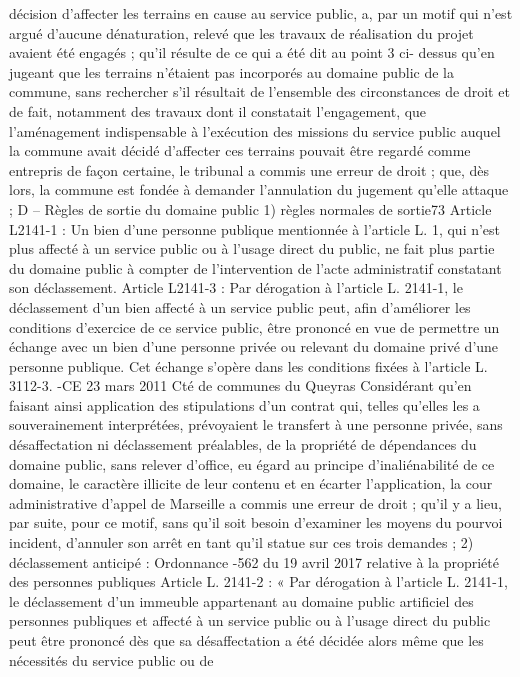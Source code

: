 \documentclass[11pt,a4paper]{report}
\begin{document}
décision d'affecter les terrains en cause au service public, a, par un motif qui n'est argué d'aucune dénaturation,
relevé que les travaux de réalisation du projet avaient été engagés ; qu'il résulte de ce qui a été dit au point 3 ci-
dessus qu'en jugeant que les terrains n'étaient pas incorporés au domaine public de la commune, sans
rechercher s'il résultait de l'ensemble des circonstances de droit et de fait, notamment des travaux dont il
constatait l'engagement, que l'aménagement indispensable à l'exécution des missions du service public auquel la
commune avait décidé d'affecter ces terrains pouvait être regardé comme entrepris de façon certaine, le tribunal
a commis une erreur de droit ; que, dès lors, la commune est fondée à demander l'annulation du jugement
qu'elle attaque ;
D – Règles de sortie du domaine public
1) règles normales de sortie73
Article L2141-1 : Un bien d'une personne publique mentionnée à l'article L. 1, qui n'est plus affecté à un service
public ou à l'usage direct du public, ne fait plus partie du domaine public à compter de l'intervention de l'acte
administratif constatant son déclassement.
Article L2141-3 : Par dérogation à l'article L. 2141-1, le déclassement d'un bien affecté à un service public
peut, afin d'améliorer les conditions d'exercice de ce service public, être prononcé en vue de permettre un
échange avec un bien d'une personne privée ou relevant du domaine privé d'une personne publique. Cet échange
s'opère dans les conditions fixées à l'article L. 3112-3.
-CE 23 mars 2011  Cté de communes du Queyras
Considérant qu’en faisant ainsi application des stipulations d’un contrat qui, telles qu’elles les a souverainement
interprétées, prévoyaient le transfert à une personne privée, sans désaffectation ni déclassement préalables, de la
propriété de dépendances du domaine public, sans relever d’office, eu égard au principe d’inaliénabilité de ce
domaine, le caractère illicite de leur contenu et en écarter l’application, la cour administrative d’appel de
Marseille a commis une erreur de droit ; qu’il y a lieu, par suite, pour ce motif, sans qu’il soit besoin d’examiner
les moyens du pourvoi incident, d’annuler son arrêt en tant qu’il statue sur ces trois demandes ;
2) déclassement anticipé : Ordonnance -562 du 19 avril 2017 relative à la propriété des personnes
publiques
Article L. 2141-2 : « Par dérogation à l'article L. 2141-1, le déclassement d'un immeuble appartenant au
domaine public artificiel des personnes publiques et affecté à un service public ou à l'usage direct du public peut
être prononcé dès que sa désaffectation a été décidée alors même que les nécessités du service public ou de
\end{document}
